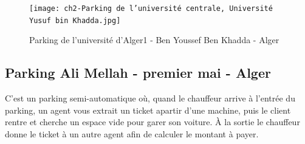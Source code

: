 \begin{figure}[H]
	\centering
	\texttt{[image: ch2-Parking de l'université centrale, Université Yusuf bin Khadda.jpg]}
	\caption{Parking de l'université d'Alger1 - Ben Youssef Ben Khadda - Alger}
 \label{Khadda}
\end{figure}


\subsection{Parking Ali Mellah - premier mai - Alger}
C'est un parking semi-automatique où, quand le chauffeur arrive à l'entrée du parking, un agent vous extrait  un ticket apartir d'une machine, puis le client rentre et cherche un espace vide pour garer son voiture.
À la sortie le chauffeur donne le ticket à un autre agent afin de calculer le montant à payer.


